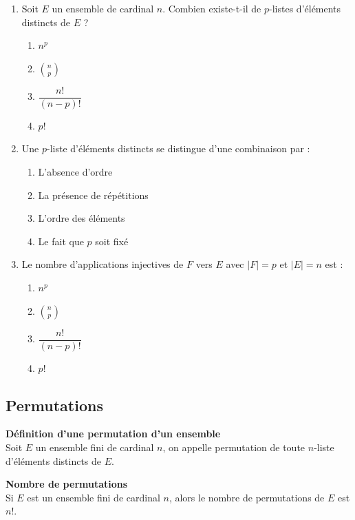 \documentclass[../PolyS4.tex]{subfiles}
\begin{document}
\begin{enumerate}
\item Soit $E$ un ensemble de cardinal $n$. Combien existe-t-il de $p$-listes d'éléments distincts de $E$ ?
\begin{enumerate}
\item $n^p$
\item $\binom{n}{p}$
\item $\dfrac{n!}{(n-p)!}$
\item $p!$
\end{enumerate}

\item Une $p$-liste d'éléments distincts se distingue d'une combinaison par :
\begin{enumerate}
\item L'absence d'ordre
\item La présence de répétitions
\item L'ordre des éléments
\item Le fait que $p$ soit fixé
\end{enumerate}

\item Le nombre d'applications injectives de $F$ vers $E$ avec $|F|=p$ et $|E|=n$ est :
\begin{enumerate}
\item $n^p$
\item $\binom{n}{p}$
\item $\dfrac{n!}{(n-p)!}$
\item $p!$
\end{enumerate}
\end{enumerate}


\subsection{Permutations}


\begin{Def}\textbf{Définition d'une permutation d'un ensemble}\\

Soit \( E \) un ensemble fini de cardinal \( n \), on appelle permutation de toute \( n \)-liste d'éléments distincts de \( E \).\\
  \end{Def}

\begin{Prop}\textbf{Nombre de permutations}\\
  Si \( E \) est un ensemble fini de cardinal \( n \), alors le nombre de permutations de \( E \) est \( n! \).\\
\end{Prop}
\end{document}
